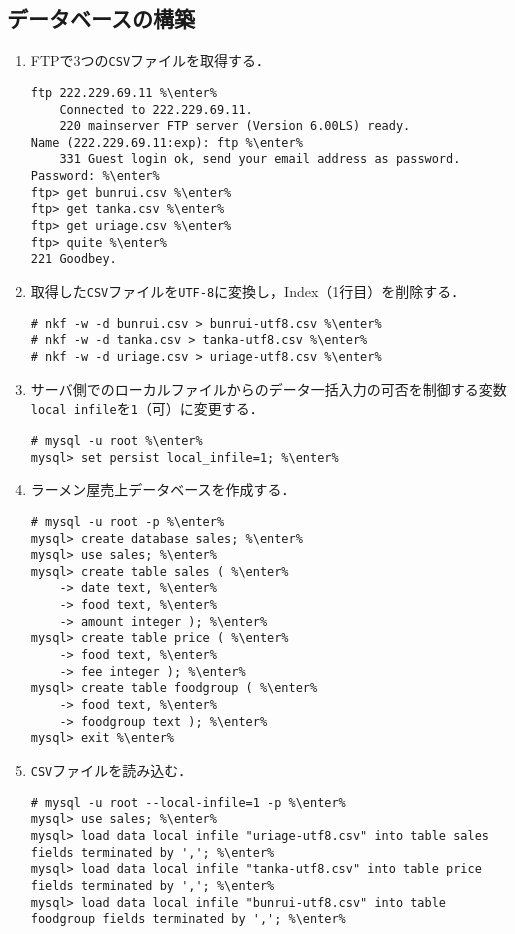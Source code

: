 \documentclass{jlreq}
\begin{document}
\subsection{データベースの構築}
\begin{enumerate}
    \item FTPで3つの\texttt{CSV}ファイルを取得する．
          \begin{lstlisting}
ftp 222.229.69.11 %\enter%
    Connected to 222.229.69.11.
    220 mainserver FTP server (Version 6.00LS) ready.
Name (222.229.69.11:exp): ftp %\enter%
    331 Guest login ok, send your email address as password.
Password: %\enter%
ftp> get bunrui.csv %\enter%
ftp> get tanka.csv %\enter%
ftp> get uriage.csv %\enter%
ftp> quite %\enter%
221 Goodbey.
\end{lstlisting}
    \item 取得した\texttt{CSV}ファイルを\texttt{UTF-8}に変換し，Index（1行目）を削除する．
          \begin{lstlisting}
# nkf -w -d bunrui.csv > bunrui-utf8.csv %\enter%
# nkf -w -d tanka.csv > tanka-utf8.csv %\enter%
# nkf -w -d uriage.csv > uriage-utf8.csv %\enter%
\end{lstlisting}
    \item サーバ側でのローカルファイルからのデータ一括入力の可否を制御する変数\texttt{local infile}を\texttt{1}（可）に変更する．
          \begin{lstlisting}
# mysql -u root %\enter%
mysql> set persist local_infile=1; %\enter%
\end{lstlisting}
    \item ラーメン屋売上データベースを作成する．
          \begin{lstlisting}
# mysql -u root -p %\enter%
mysql> create database sales; %\enter%
mysql> use sales; %\enter%
mysql> create table sales ( %\enter%
    -> date text, %\enter%
    -> food text, %\enter%
    -> amount integer ); %\enter%
mysql> create table price ( %\enter%
    -> food text, %\enter%
    -> fee integer ); %\enter%
mysql> create table foodgroup ( %\enter%
    -> food text, %\enter%
    -> foodgroup text ); %\enter%
mysql> exit %\enter%
\end{lstlisting}
    \item \texttt{CSV}ファイルを読み込む．
          \begin{lstlisting}
# mysql -u root --local-infile=1 -p %\enter%
mysql> use sales; %\enter%
mysql> load data local infile "uriage-utf8.csv" into table sales fields terminated by ','; %\enter%
mysql> load data local infile "tanka-utf8.csv" into table price fields terminated by ','; %\enter%
mysql> load data local infile "bunrui-utf8.csv" into table foodgroup fields terminated by ','; %\enter%
\end{lstlisting}
\end{enumerate}
\end{document}
